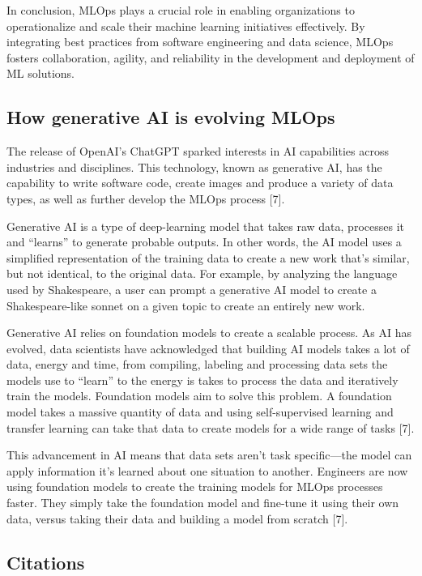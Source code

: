 \documentclass[
  letterpaper,
  DIV=11,
  numbers=noendperiod]{scrartcl}
\begin{document}
In conclusion, MLOps plays a crucial role in enabling organizations to
operationalize and scale their machine learning initiatives effectively.
By integrating best practices from software engineering and data
science, MLOps fosters collaboration, agility, and reliability in the
development and deployment of ML solutions.

\subsection{How generative AI is evolving
MLOps}\label{how-generative-ai-is-evolving-mlops}

The release of OpenAI's ChatGPT sparked interests in AI capabilities
across industries and disciplines. This technology, known as generative
AI, has the capability to write software code, create images and produce
a variety of data types, as well as further develop the MLOps process
{[}7{]}.

Generative AI is a type of deep-learning model that takes raw data,
processes it and ``learns'' to generate probable outputs. In other
words, the AI model uses a simplified representation of the training
data to create a new work that's similar, but not identical, to the
original data. For example, by analyzing the language used by
Shakespeare, a user can prompt a generative AI model to create a
Shakespeare-like sonnet on a given topic to create an entirely new work.

Generative AI relies on foundation models to create a scalable process.
As AI has evolved, data scientists have acknowledged that building AI
models takes a lot of data, energy and time, from compiling, labeling
and processing data sets the models use to ``learn'' to the energy is
takes to process the data and iteratively train the models. Foundation
models aim to solve this problem. A foundation model takes a massive
quantity of data and using self-supervised learning and transfer
learning can take that data to create models for a wide range of tasks
{[}7{]}.

This advancement in AI means that data sets aren't task specific---the
model can apply information it's learned about one situation to another.
Engineers are now using foundation models to create the training models
for MLOps processes faster. They simply take the foundation model and
fine-tune it using their own data, versus taking their data and building
a model from scratch {[}7{]}.

\subsection{Citations}\label{citations}
\end{document}
